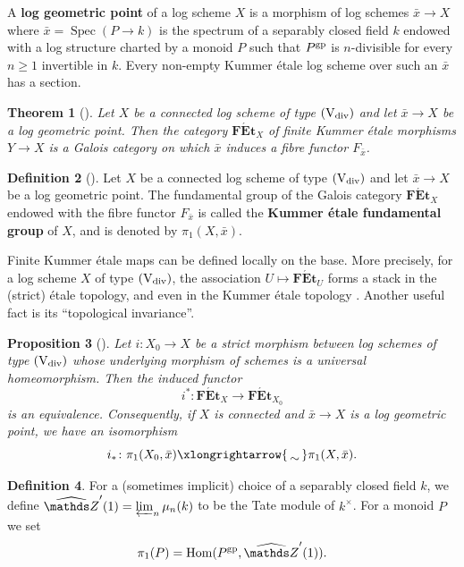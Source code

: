 \documentclass[a4paper,twoside,11pt,reqno]{amsart}
\renewcommand{\mathbb}{\mathds}
\newcommand{\bZ}{{\mathbb Z}}
\newcommand{\isomto}{\xlongrightarrow{\,\smash{\raisebox{-0.65ex} 
    {\ensuremath{\displaystyle\sim}}}\,}}
\newcommand{\la}{\longrightarrow}
\DeclareMathOperator{\Hom}{Hom}
\DeclareMathOperator{\Spec}{Spec}
\newcommand{\gp}{{\rm gp}}
\newcommand{\cat}[1]{\mathbf{#1}}
\newcommand{\FEt}{\cat{F\acute{E}t}}
\newcommand{\typeVd}{(\mathrm{V}_{\rm div})}
\newtheorem{thm}{Theorem}[subsection]
\newtheorem{prop}[thm]{Proposition}
\theoremstyle{definition}
\newtheorem{defi}[thm]{Definition}
\numberwithin{equation}{subsection}
\begin{document}
A {\bf log geometric point} of a log scheme $X$ is a morphism of log schemes $\bar{x}\to X$ where $\bar{x} = \Spec(P\to k)$ is the spectrum of a separably closed field $k$ endowed with a log structure charted by a monoid $P$ such that $P^\gp$ is $n$-divisible for every $n\geq 1$ invertible in $k$. Every non-empty Kummer \'etale log scheme over such an $\bar{x}$ has a section.

\begin{thm}[{\cite[Theorem~4.3.2]{AHLS-Log}}] \label{thm:FKEt-Galois}
    Let $X$ be a connected log scheme of type $\typeVd$ and let $\bar{x}\to X$ be a log geometric point. Then the category $\FEt_X$ of finite Kummer \'etale morphisms $Y\to X$ is a Galois category on which $\bar{x}$ induces a fibre functor $F_{\bar{x}}$. 
\end{thm}

\begin{defi}[{\cite[Definition~4.3.3]{AHLS-Log}}] \label{def:FKEt-pi1}
    Let $X$ be a connected log scheme of type $\typeVd$ and let $\bar{x}\to X$ be a log geometric point. The fundamental group of the Galois category $\FEt_X$ endowed with the fibre functor $F_{\bar{x}}$ is called the {\bf Kummer \'etale fundamental group} of $X$, and is denoted by $\pi_1(X, \bar{x})$.
\end{defi}

Finite Kummer \'etale maps can be defined locally on the base. More precisely, for a log scheme $X$ of type $\typeVd$, the association $U\mapsto \FEt_U$ forms a stack in the (strict) \'etale topology, and even in the Kummer \'etale topology \cite[Corollary~4.3.7]{AHLS-Log}. 
Another useful fact is its ``topological invariance''.

\begin{prop}[{\cite[Proposition~4.2.4(d)]{AHLS-Log}}] \label{prop:FKEt-top-inv}
    Let $i\colon X_0\to X$ be a strict morphism between log schemes of type $\typeVd$ whose underlying morphism of schemes is a universal homeomorphism. Then the induced functor
    \[ 
        i^*\colon \FEt_X \la \FEt_{X_0}
    \]
    is an equivalence. Consequently, if $X$ is connected and $\bar x\to X$ is a log geometric point, we have an isomorphism
    \[ 
        i_* \colon \pi_1(X_0, \bar{x}) \isomto \pi_1(X, \bar{x}).
    \]
\end{prop}

\begin{defi}
\label{defi:pi1-of-monoid}
    For a (sometimes implicit) choice of a separably closed field $k$, we define $\widehat{\bZ}'(1) = \varprojlim_n \mu_n(k)$ to be the Tate module of $k^\times$.
    For a monoid $P$ we set
    \[
        \pi_1(P) = \Hom(P^{\rm gp}, \widehat{\bZ}'(1)).
    \]
\end{defi}
\end{document}
